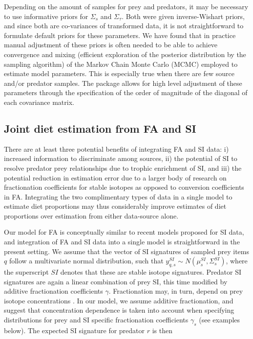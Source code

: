 \documentclass{article}%
\begin{document}
\begin{spacing}{1.9}
\begin{flushleft}
Depending on the amount of samples for prey and predators, it
may be necessary to use informative priors for $\Sigma_{s}$ and
$\Sigma_{\tau}$. Both were given inverse-Wishart priors, and since both are co-variances of transformed data, it is
not straightforward to formulate default priors for these parameters. We have found that in practice manual adjustment of these priors
is often needed to be able to achieve convergence and mixing
(efficient exploration of the posterior distribution by the sampling
algorithm) of the Markov Chain Monte Carlo (MCMC) employed to estimate
model parameters. This is especially true when there are few source and/or predator samples. The
package allows for high level adjustment of these parameters through
the specification of the order of magnitude of the diagonal of each
covariance matrix. 

\subsection{Joint diet estimation from FA and SI}
There are at least three potential benefits of integrating FA and SI
data: i) increased information to discriminate among sources, ii) the
potential of SI to resolve predator prey relationships due to trophic
enrichment of SI, and iii) the potential reduction in estimation error
due to a larger body of research on fractionation coefficients for stable
isotopes as opposed to conversion coefficients in FA. Integrating the two complimentary types of data
in a single model to estimate diet proportions may thus considerably
improve estimates of diet proportions over estimation from either
data-source alone.

Our model for FA is conceptually similar to recent models proposed for SI data, and
integration of FA and SI data into a single model is straightforward
in the present setting. We assume that the vector of SI signatures of
sampled prey
items $q$ follow a multivariate normal distribution, such that
$y_{q,s}^{SI} \sim N(\mu_s^{SI},\Sigma_s^{SI})$, where the superscript
$SI$ denotes that these are stable isotope signatures. Predator SI
signatures are again a linear combination of prey SI, this time
modified by additive fractionation coefficients
$\gamma$. Fractionation may, in turn, depend on prey isotope concentrations
\citep{hussey_rescaling_2014,caut_variation_2009}. In our model, we
assume additive fractionation, and suggest that concentration
dependence is taken into account when specifying distributions for
prey and SI specific fractionation coefficients $\gamma_s$ (see
examples below). The expected SI signature for predator $r$ is then


\end{flushleft}
\end{spacing}
\end{document}
